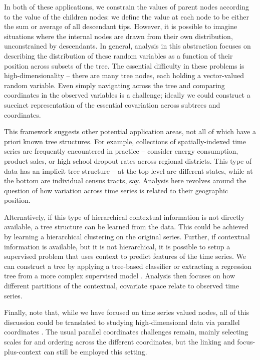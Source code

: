 \documentclass[12pt]{article}
\begin{document}
In both of these applications, we constrain the values of parent nodes
according to the value of the children nodes: we define the value at
each node to be either the sum or average of all descendant tips.
However, it is possible to imagine situations where the internal nodes
are drawn from their own distribution, unconstrained by descendants. In
general, analysis in this abstraction focuses on describing the
distribution of these random variables as a function of their position
across subsets of the tree. The essential difficulty in these problems
is high-dimensionality -- there are many tree nodes, each holding a
vector-valued random variable. Even simply navigating across the tree
and comparing coordinates in the observed variables is a challenge;
ideally we could construct a succinct representation of the essential
covariation across subtrees and coordinates.

This framework suggests other potential application areas, not all of
which have a priori known tree structures. For example, collections of
spatially-indexed time series are frequently encountered in practice --
consider energy consumption, product sales, or high school dropout rates
across regional districts. This type of data has an implicit tree
structure -- at the top level are different states, while at the bottom
are individual census tracts, say. Analysis here revolves around the
question of how variation across time series is related to their
geographic position.

Alternatively, if this type of hierarchical contextual information is
not directly available, a tree structure can be learned from the data.
This could be achieved by learning a hierarchical clustering on the
original series. Further, if contextual information is available, but it
is not hierarchical, it is possible to setup a supervised problem that
uses context to predict features of the time series. We can construct a tree by
applying a tree-based classifier \citep{breiman1984classification} or extracting
a regression tree from a more complex supervised model
\citep{boz2002extracting,saito2002extracting}. Analysis then focuses on how
different partitions of the contextual, covariate space relate to observed time
series.

Finally, note that, while we have focused on time series valued nodes,
all of this discussion could be translated to studying high-dimensional
data via parallel coordinates \citep{inselberg1991parallel}. The usual parallel
coordinates challenges remain, mainly selecting scales for and ordering
across the different coordinates, but the linking and focus-plus-context
can still be employed this setting.
\end{document}
